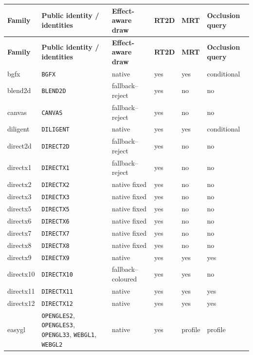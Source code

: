 \begin{center}
\scriptsize
\setlength{\tabcolsep}{2.5pt}
\begin{longtable}{>{\raggedright\arraybackslash}p{1.75cm}>{\raggedright\arraybackslash}p{3.1cm}>{\raggedright\arraybackslash}p{2.25cm}>{\raggedright\arraybackslash}p{1.55cm}>{\raggedright\arraybackslash}p{1.55cm}>{\raggedright\arraybackslash}p{1.8cm}}
\toprule
\textbf{Family} & \textbf{Public identity / identities} & \textbf{Effect-aware draw} &
\textbf{RT2D} & \textbf{MRT} & \textbf{Occlusion query} \\
\midrule
\endfirsthead
\toprule
\textbf{Family} & \textbf{Public identity / identities} & \textbf{Effect-aware draw} &
\textbf{RT2D} & \textbf{MRT} & \textbf{Occlusion query} \\
\midrule
\endhead
bgfx & \texttt{BGFX} & native & yes & yes & conditional \\
blend2d & \texttt{BLEND2D} & fallback--reject & yes & no & no \\
canvas & \texttt{CANVAS} & fallback--reject & yes & no & no \\
diligent & \texttt{DILIGENT} & native & yes & yes & conditional \\
direct2d & \texttt{DIRECT2D} & fallback--reject & yes & no & no \\
directx1 & \texttt{DIRECTX1} & fallback--reject & yes & no & no \\
directx2 & \texttt{DIRECTX2} & native fixed & yes & no & no \\
directx3 & \texttt{DIRECTX3} & native fixed & yes & no & no \\
directx5 & \texttt{DIRECTX5} & native fixed & yes & no & no \\
directx6 & \texttt{DIRECTX6} & native fixed & yes & no & no \\
directx7 & \texttt{DIRECTX7} & native fixed & yes & no & no \\
directx8 & \texttt{DIRECTX8} & native fixed & yes & no & no \\
directx9 & \texttt{DIRECTX9} & native & yes & yes & yes \\
directx10 & \texttt{DIRECTX10} & fallback--coloured & yes & yes & no \\
directx11 & \texttt{DIRECTX11} & native & yes & yes & yes \\
directx12 & \texttt{DIRECTX12} & native & yes & yes & yes \\
easygl & \texttt{OPENGLES2}, \texttt{OPENGLES3}, \texttt{OPENGL33},
  \texttt{WEBGL1}, \texttt{WEBGL2} & native & yes & profile & profile \\

\end{longtable}
\end{center}
